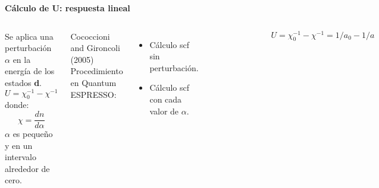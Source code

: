\begin{frame}
    {\bf C\'alculo de U: respuesta lineal}
    \begin{columns}[t]
        Se aplica una perturbaci\'on $\alpha$ en la energ\'ia de los estados {\bf d}.
        \[ U = \chi _{0}^{-1} - \chi ^{-1} \]
        donde: \[ \chi  = \frac{d n}{d \alpha } \]
        $\alpha$ es peque\~no y en un intervalo alrededor de cero.

        {\scriptsize Cococcioni and Gironcoli (2005)}        
        Procedimiento en Quantum ESPRESSO:
        \begin{itemize}
            \item C\'alculo scf sin perturbaci\'on.
            \item C\'alculo scf con cada valor de $\alpha$.
        \end{itemize}
    \begin{figure}[H]
        \centering
        \includegraphics[width=1.0\textwidth]{contenido/teoria/img_teoria/RespuestaLineal.png}
    \end{figure}
\[ U = \chi _{0}^{-1} - \chi ^{-1} = 1/a_{0} - 1/a  \]
    \end{columns}
\end{frame}